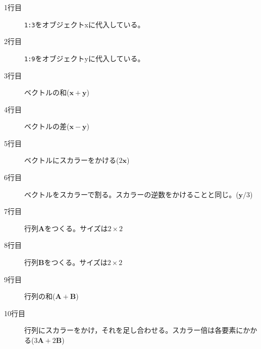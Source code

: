 \begin{description}
	\item[1行目] \texttt{1:3}をオブジェクトxに代入している。
	\item[2行目] \texttt{1:9}をオブジェクトyに代入している。
	\item[3行目] ベクトルの和($\bm{x}+\bm{y}$)
	\item[4行目] ベクトルの差($\bm{x}-\bm{y}$)
	\item[5行目] ベクトルにスカラーをかける($2\bm{x}$)
	\item[6行目] ベクトルをスカラーで割る。スカラーの逆数をかけることと同じ。($\bm{y}/3$)
	\item[7行目] 行列$\bm{A}$をつくる。サイズは$2 \times 2$
	\item[8行目] 行列$\bm{B}$をつくる。サイズは$2 \times 2$
	\item[9行目] 行列の和($\bm{A}+\bm{B}$)
	\item[10行目] 行列にスカラーをかけ，それを足し合わせる。スカラー倍は各要素にかかる($3\bm{A}+2\bm{B}$)
\end{description}
